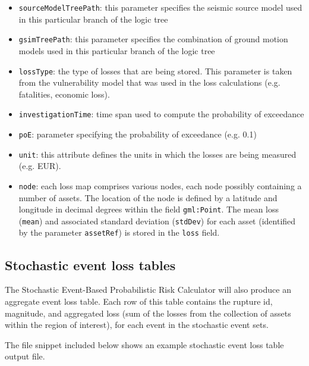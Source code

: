 \begin{itemize}

  \item \Verb+sourceModelTreePath+: this parameter specifies the seismic
    source model used in this particular branch of the logic tree

  \item \Verb+gsimTreePath+: this parameter specifies the combination of
    ground motion models used in this particular branch of the logic tree

  \item \Verb+lossType+: the type of losses that are being stored. This
    parameter is taken from the \gls{vulnerability model} that was used in the
    loss calculations (e.g. fatalities, economic loss).

  \item \Verb+investigationTime+: time span used to compute the probability of exceedance
  
  \item \Verb+poE+: parameter specifying the probability of exceedance (e.g. 0.1)

  \item \Verb+unit+: this attribute defines the units in which the losses are
    being measured (e.g. EUR).

  \item \Verb+node+: each loss map comprises various nodes, each node possibly
    containing a number of \glspl{asset}. The location of the node is defined
    by a latitude and longitude in decimal degrees within the field
    \Verb+gml:Point+. The mean loss (\Verb+mean+) and associated standard
    deviation (\Verb+stdDev+) for each \gls{asset} (identified by the parameter
    \Verb+assetRef+) is stored in the \Verb+loss+ field.

\end{itemize}


\subsection{Stochastic event loss tables}

The Stochastic Event-Based Probabilistic Risk Calculator will also produce an 
aggregate event loss table. Each row of this table contains the rupture id, magnitude, and aggregated loss (sum of the
losses from the collection of assets within the region of interest), for each
event in the stochastic event sets.

The file snippet included below shows an example stochastic event loss table
output file.

